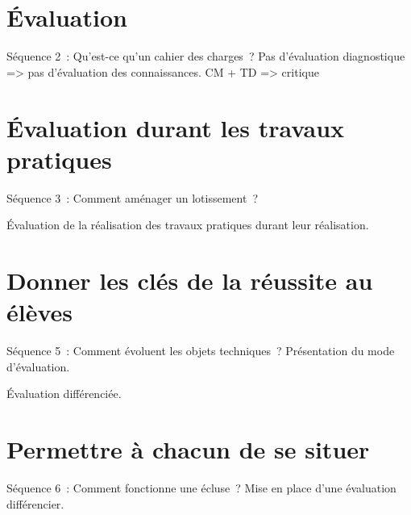 
\section{Évaluation }
Séquence 2~: Qu'est-ce qu'un cahier des charges~?
Pas d'évaluation diagnostique => pas d'évaluation des connaissances.
CM + TD => critique


\section{Évaluation durant les travaux pratiques}
Séquence 3~: Comment aménager un lotissement~?

Évaluation de la réalisation des travaux pratiques durant leur réalisation.


\section{Donner les clés de la réussite au élèves }
Séquence 5~: Comment évoluent les objets techniques~?
Présentation du mode d'évaluation.

Évaluation différenciée.


\section{Permettre à chacun de se situer }
Séquence 6~: Comment fonctionne une écluse~?
Mise en place d'une évaluation différencier.



